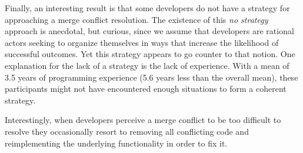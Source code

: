 Finally, an interesting result is that some developers do not have a strategy for approaching a merge conflict resolution.
The existence of this \textit{no strategy} approach is anecdotal, but curious, since we assume that developers are rational actors seeking to organize themselves in ways that increase the likelihood of successful outcomes.
Yet this strategy appears to go counter to that notion.
One explanation for the lack of a strategy is the lack of experience.
With a mean of 3.5 years of programming experience (5.6 years less than the overall mean), these participants might not have encountered enough situations to form a coherent strategy.

Interestingly, when developers perceive a merge conflict to be too difficult to resolve they occasionally resort to removing all conflicting code and reimplementing the underlying functionality in order to fix it.